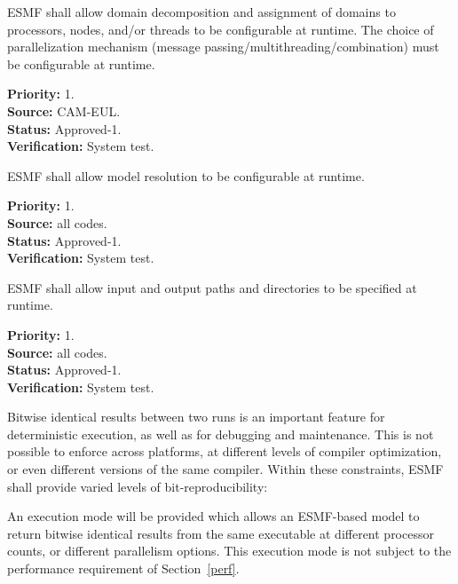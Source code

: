  ESMF shall allow domain
decomposition and assignment of domains to processors, nodes, and/or
threads to be configurable at runtime.  The choice of parallelization
mechanism (message passing/multithreading/combination) must be
configurable at runtime.
\label{req:gr:Configurable_decomposition}
\begin{reqlist}
{\bf Priority:} 1. \\
{\bf Source:} CAM-EUL. \\
{\bf Status:} Approved-1. \\
{\bf Verification:} System test.
\end{reqlist}

ESMF shall allow model resolution to be configurable at runtime.
\begin{reqlist}
{\bf Priority:} 1. \\
{\bf Source:} all codes. \\
{\bf Status:} Approved-1. \\
{\bf Verification:} System test.
\end{reqlist}

ESMF shall allow input and output paths and directories to be specified
at runtime.
\label{req:gr:Configurable_paths_and_directories}
\begin{reqlist}
{\bf Priority:} 1. \\
{\bf Source:} all codes. \\
{\bf Status:} Approved-1. \\
{\bf Verification:} System test.
\end{reqlist}


Bitwise identical results between two runs is an important feature for
deterministic execution, as well as for debugging and maintenance.
This is not possible to enforce across platforms, at different levels
of compiler optimization, or even different versions of the same
compiler. Within these constraints, ESMF shall provide varied levels
of bit-reproducibility:


An execution mode will be provided which allows an ESMF-based model to
return bitwise identical results from the same executable at different
processor counts, or different parallelism options. This execution
mode is not subject to the performance requirement of Section~\ref{perf}.

